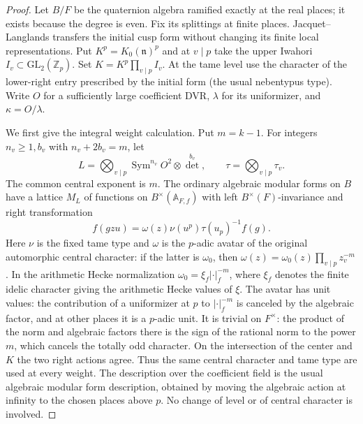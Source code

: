 \begin{proof}
Let \(B/F\) be the quaternion algebra ramified exactly at the real
places; it exists because the degree is even. Fix its splittings at
finite places. Jacquet--Langlands transfers the initial cusp form
without changing its finite local representations. Put
\(K^p=K_0(\mathfrak n)^p\) and at \(v\mid p\) take the upper
Iwahori \(I_v\subset\mathrm{GL}_2(\mathbb Z_p)\). Set
\(K=K^p\prod_{v\mid p}I_v\). At the tame level use the character
of the lower-right entry prescribed by the initial form (the usual
nebentypus type). Write \(O\) for a sufficiently large coefficient
DVR, \(\lambda\) for its uniformizer, and \(\kappa=O/\lambda\).

We first give the integral weight calculation. Put \(m=k-1\).
For integers \(n_v\ge1,b_v\) with \(n_v+2b_v=m\), let
\[
 L=\bigotimes_{v\mid p}
       \operatorname{Sym}^{n_v}O^2\otimes\det^{b_v},
 \qquad \tau=\bigotimes_{v\mid p}\tau_v .
\]
The common central exponent is \(m\). The ordinary algebraic
modular forms on \(B\) have a lattice \(M_L\) of functions on
\(B^\times(\mathbb A_{F,f})\) with left \(B^\times(F)\)-invariance
and right transformation
\[
 f(gzu)=\omega(z)\nu(u^p)\tau(u_p)^{-1}f(g).
\]
Here \(\nu\) is the fixed tame type and \(\omega\) is the
\(p\)-adic avatar of the original automorphic central character:
if the latter is \(\omega_0\), then
\(\omega(z)=\omega_0(z)\prod_{v\mid p}z_v^{-m}\).
In the arithmetic Hecke normalization \(\omega_0=\xi_f|\cdot|_f^{-m}\),
where \(\xi_f\) denotes the finite idelic character giving the
arithmetic Hecke values of \(\xi\). The avatar has unit values:
the contribution of a uniformizer at \(p\) to
\(|\cdot|_f^{-m}\) is canceled by the algebraic factor, and at other
places it is a \(p\)-adic unit. It is trivial on \(F^\times\):
the product of the norm and algebraic factors there is the sign
of the rational norm to the power \(m\), which cancels the totally
odd character. On the intersection of the center and \(K\) the
two right actions agree. Thus the same central character and tame
type are used at every weight. The description over the coefficient
field is the usual algebraic modular form description, obtained by
moving the algebraic action at infinity to the chosen places above
\(p\). No change of level or of central character is involved.


\end{proof}
